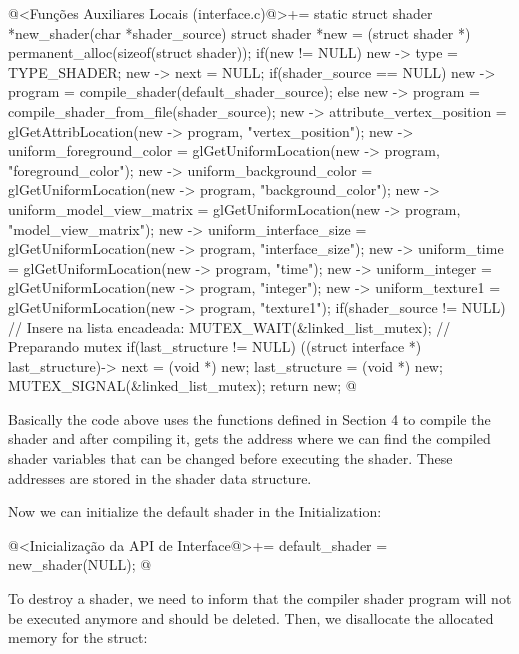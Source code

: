 \iniciocodigo
@<Funções Auxiliares Locais (interface.c)@>+=
static struct shader *new_shader(char *shader_source){
  struct shader *new = (struct shader *) permanent_alloc(sizeof(struct shader));
  if(new != NULL){
    new -> type = TYPE_SHADER;
    new -> next = NULL;
    if(shader_source == NULL)
      new -> program = compile_shader(default_shader_source);
    else
      new -> program = compile_shader_from_file(shader_source);
    new -> attribute_vertex_position = glGetAttribLocation(new -> program,
                                                           "vertex_position");
    new -> uniform_foreground_color =  glGetUniformLocation(new -> program,
                                                            "foreground_color");
    new -> uniform_background_color =  glGetUniformLocation(new -> program,
                                                            "background_color");
    new -> uniform_model_view_matrix = glGetUniformLocation(new -> program,
                                                            "model_view_matrix");
    new -> uniform_interface_size = glGetUniformLocation(new -> program,
                                                         "interface_size");
    new -> uniform_time = glGetUniformLocation(new -> program, "time");
    new -> uniform_integer = glGetUniformLocation(new -> program, "integer");
    new -> uniform_texture1 = glGetUniformLocation(new -> program, "texture1");
    if(shader_source != NULL){ // Insere na lista encadeada:
      MUTEX_WAIT(&linked_list_mutex); // Preparando mutex
      if(last_structure != NULL)
        ((struct interface *) last_structure)-> next = (void *) new;
      last_structure = (void *) new;
      MUTEX_SIGNAL(&linked_list_mutex);
    }
  }
  return new;
}
@
\fimcodigo

Basically the code above uses the functions defined in Section 4 to
compile the shader and after compiling it, gets the address where we
can find the compiled shader variables that can be changed before
executing the shader. These addresses are stored in the shader data
structure.

Now we can initialize the default shader in the Initialization:

\iniciocodigo
@<Inicialização da API de Interface@>+=
default_shader = new_shader(NULL);
@
\fimcodigo

To destroy a shader, we need to inform that the compiler shader
program will not be executed anymore and should be deleted. Then, we
disallocate the allocated memory for the struct:


